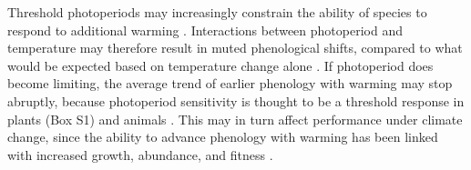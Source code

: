 \documentclass{article}
\begin{document}
\par Threshold photoperiods may increasingly constrain the ability of species to respond to additional warming \citep{koerner2010b,vitasse2013, Morin:2010aa,Nienstaedt:1966aa}. Interactions between photoperiod and temperature may therefore result in muted phenological shifts, compared to what would be expected based on temperature change alone \citep{wareing1956,mimura2007,koerner2010b}. If photoperiod does become limiting, the average trend of earlier phenology with warming \citep{menzel2000,ovaskainen2013,penuelas2002,polgar2013} may stop abruptly, because photoperiod sensitivity is thought to be a threshold response in plants (Box S1) and animals \citep{tobin2008,grevstad2015}. This may in turn affect performance under climate change, since the ability to advance phenology with warming has been linked with increased growth, abundance, and fitness \citep{muir1994,cleland2012,willis2010}.%


\end{document}
